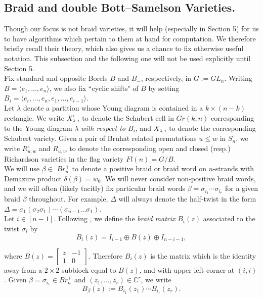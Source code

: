 \documentclass[11pt]{amsart}
\theoremstyle{definition}
\theoremstyle{remark}
\numberwithin{equation}{section}
\begin{document}
\subsection{Braid and double Bott--Samelson Varieties.}

Though our focus is not braid varieties, it will help (especially in Section 5) for us to have algorithms which pertain to them at hand for computation. We therefore briefly recall their theory, which also gives us a chance to fix otherwise useful notation. This subsection and the following one will not be used explicitly until Section 5.\\


Fix standard and opposite Borels $B$ and $B_-$, respectively, in $G := GL_n$. Writing $B = \langle e_1, ..., e_n \rangle$, we also fix ``cyclic shifts" of $B$ by setting $B_i = \langle e_i, ..., e_n, e_1, ..., e_{i - 1}\rangle$.\\

Let $\lambda$ denote a partition whose Young diagram is contained in a $k \times (n-k)$ rectangle. We write $X_{\lambda, i}^\circ$ to denote the Schubert cell in $Gr(k,n)$ corresponding to the Young diagram $\lambda$ \textit{with respect to $B_i$}, and $X_{\lambda, i}$ to denote the corresponding Schubert variety. Given a pair of Bruhat related permutations $u \leq w$ in $S_n$, we write $R_{u,w}^\circ$ and $R_{u,w}$ to denote the corresponding open and closed (resp.) Richardson varieties in the flag variety $Fl(n) = G/B$.\\

We will use $\beta \in$ $Br_n^+$ to denote a positive braid or braid word on $n$-strands with Demazure product $\delta(\beta) = w_0$. We will never consider non-positive braid words, and we will often (likely tacitly) fix particular braid words $\beta = \sigma_{i_1} \cdots \sigma_{i_r}$ for a given braid $\beta$ throughout. For example, $\Delta$ will always denote the half-twist in the form $\Delta = \sigma_1(\sigma_2 \sigma_1)\cdots(\sigma_{n-1}\dots \sigma_1)$.\\

Let $i \in [n-1]$. Following \cite{CGGLSS}, we define the \textit{braid matrix} $B_i(z)$  associated to the twist $\sigma_i$ by
\begin{equation} B_i(z) = I_{i-1} \oplus B(z) \oplus I_{n - i - 1},
\end{equation}

\noindent where $B(z) = \begin{bmatrix}
    z      & -1  \\
    1       & 0
\end{bmatrix}.$
Therefore $B_i(z)$ is the matrix which is the identity away from a $2 \times 2$ subblock equal to $B(z)$, and with upper left corner at $(i,i)$. Given $\beta = \sigma_{i_1}  \in Br^+_n$ and $(z_1, ..., z_r) \in \mathbb{C}^r$, we write 
\begin{equation}
    B_\beta(z) := B_{i_1}(z_1) \cdots B_{i_r}(z_r).
\end{equation}
\end{document}
